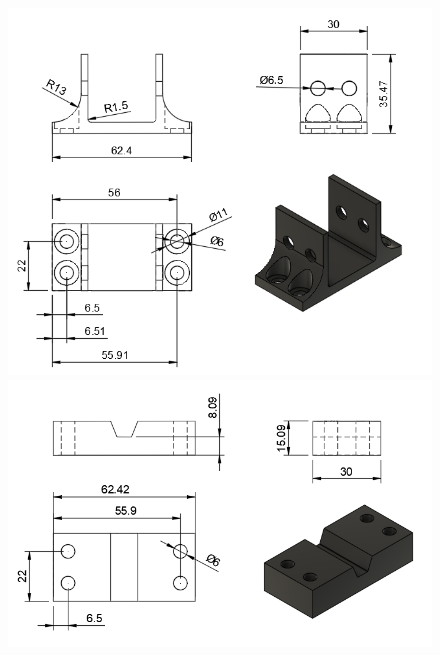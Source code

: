 \begin{figure}[H]
\begin{minipage}{0.45\textwidth}
        \caption{}
        \label{fig:soporte_motor2}
    \end{minipage}%
    \hfill
\end{figure}


\begin{figure}[H]
    \centering
    \begin{minipage}{0.45\textwidth}
        \centering
        \includegraphics[width=\textwidth]{PLANOS/PLANO_SUJ_BANDA_1.png}
        \caption{}
        \label{fig:suj_banda}
    \end{minipage}%
    \hfill
    \begin{minipage}{0.45\textwidth}
        \centering
        \includegraphics[width=\textwidth]{PLANOS/PLANO_SUJ_BANDA_2.png}
        \caption{}
        \label{fig:suj_banda2}
    \end{minipage}%
    \hfill
\end{figure}

